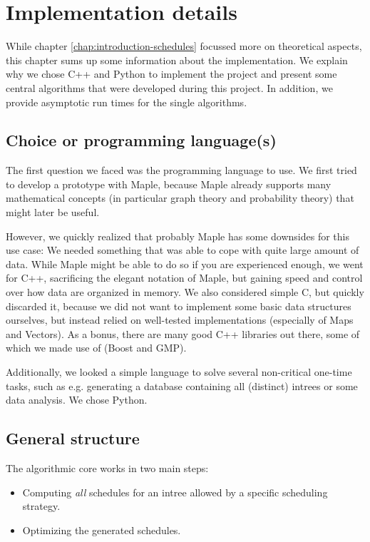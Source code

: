 \chapter{Implementation details}
\label{sec:additional-algs}

While chapter \ref{chap:introduction-schedules} focussed more on theoretical aspects, this chapter sums up some information about the implementation. We explain why we chose C++ and Python to implement the project and present some central algorithms that were developed during this project. In addition, we provide asymptotic run times for the single algorithms.

\section{Choice or programming language(s)}
\label{sec:implementation-prog-lang}

The first question we faced was the programming language to use. We first tried to develop a prototype with Maple, because Maple already supports many mathematical concepts (in particular graph theory and probability theory) that might later be useful.

However, we quickly realized that probably Maple has some downsides for this use case: We needed something that was able to cope with quite large amount of data. While Maple might be able to do so if you are experienced enough, we went for C++, sacrificing the elegant notation of Maple, but gaining speed and control over how data are organized in memory. We also considered simple C, but quickly discarded it, because we did not want to implement some basic data structures ourselves, but instead relied on well-tested implementations (especially of Maps and Vectors). As a bonus, there are many good C++ libraries out there, some of which we made use of (Boost and GMP).

Additionally, we looked a simple language to solve several non-critical one-time tasks, such as e.g. generating a database containing all (distinct) intrees or some data analysis. We chose Python.

\section{General structure}
\label{sec:implementation-general-structure}

The algorithmic core works in two main steps: 
\begin{itemize}
\item Computing \emph{all} schedules for an intree allowed by a specific scheduling strategy.
\item Optimizing the generated schedules.
\end{itemize}

